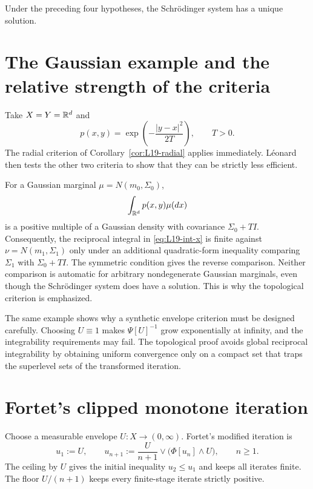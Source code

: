 \begin{proposition}\label{prop:L19-holder-existence}
Under the preceding four hypotheses, the Schr\"odinger system has a unique solution.
\end{proposition}

\section{The Gaussian example and the relative strength of the criteria}
Take $X=Y=\mathbb{R}^d$ and
\[
 p(x,y)=\exp\!\left(-\frac{|y-x|^2}{2T}\right),
 \qquad T>0.
\]
The radial criterion of Corollary~\ref{cor:L19-radial} applies immediately.  L\'eonard then tests the other two criteria to show that they can be strictly less efficient.

For a Gaussian marginal $\mu=N(m_0,\Sigma_0)$,
\[
 \int_{\mathbb{R}^d}p(x,y)\mu(dx)
\]
is a positive multiple of a Gaussian density with covariance $\Sigma_0+TI$.  Consequently, the reciprocal integral in \eqref{eq:L19-int-x} is finite against $\nu=N(m_1,\Sigma_1)$ only under an additional quadratic-form inequality comparing $\Sigma_1$ with $\Sigma_0+TI$.  The symmetric condition gives the reverse comparison.  Neither comparison is automatic for arbitrary nondegenerate Gaussian marginals, even though the Schr\"odinger system does have a solution.  This is why the topological criterion is emphasized.

The same example shows why a synthetic envelope criterion must be designed carefully.  Choosing $U\equiv1$ makes $\Psi[U]^{-1}$ grow exponentially at infinity, and the integrability requirements may fail.  The topological proof avoids global reciprocal integrability by obtaining uniform convergence only on a compact set that traps the superlevel sets of the transformed iteration.

\section{Fortet's clipped monotone iteration}
Choose a measurable envelope $U:X\to(0,\infty)$.  Fortet's modified iteration is
\begin{equation}\label{eq:L19-iteration}
 u_1:=U,
 \qquad
 u_{n+1}:=\frac{U}{n+1}\vee\bigl(\Phi[u_n]\wedge U\bigr),
 \qquad n\ge1.
\end{equation}
The ceiling by $U$ gives the initial inequality $u_2\le u_1$ and keeps all iterates finite.  The floor $U/(n+1)$ keeps every finite-stage iterate strictly positive.

